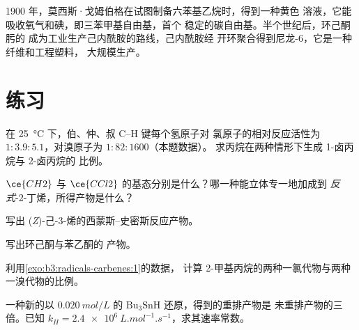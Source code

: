 \begin{history}
1900 年，莫西斯·戈姆伯格在试图制备六苯基乙烷时，得到一种黄色
溶液，它能吸收氧气和碘，即三苯甲基自由基，首个
稳定的碳自由基。半个世纪后，环己酮肟的
成为工业生产己内酰胺的路线，己内酰胺经
开环聚合得到尼龙-6，它是一种纤维和工程塑料，
大规模生产。
\end{history}

\section{练习}

\begin{exercise}[$\star$]\label{exo:b3:radicals-carbenes:1}
在 \qty{25}{\celsius} 下，伯、仲、叔 C--H 键每个氢原子对
氯原子的相对反应活性为 $1 : 3.9 : 5.1$，对溴原子为 $1 : 82 : 1600$（本题数据）。
求丙烷在两种情形下生成 1-卤丙烷与 2-卤丙烷的
比例。
\end{exercise}

\begin{exercise}[$\star$]\label{exo:b3:radicals-carbenes:2}
$\ce{CH2}$ 与 $\ce{CCl2}$ 的基态分别是什么？哪一种能立体专一地加成到
\textit{反式}-2-丁烯，所得产物是什么？
\end{exercise}

\begin{exercise}[$\star$]\label{exo:b3:radicals-carbenes:3}
写出 (\textit{Z})-己-3-烯的西蒙斯–史密斯反应产物。
\end{exercise}

\begin{exercise}[$\star$]\label{exo:b3:radicals-carbenes:4}
写出环己酮与苯乙酮的
产物。
\end{exercise}

\begin{exercise}[$\star\star$]\label{exo:b3:radicals-carbenes:5}
利用\cref{exo:b3:radicals-carbenes:1}的数据，
计算 2-甲基丙烷的两种一氯代物与两种一溴代物的比例。
\end{exercise}

\begin{exercise}[$\star\star$]\label{exo:b3:radicals-carbenes:6}
一种新的以 $\qty{0.020}{mol/L}$ 的 $\mathrm{Bu_3SnH}$ 还原，得到的重排产物是
未重排产物的三倍。已知 $k_H = \qty{2.4e6}{L.mol^{-1}.s^{-1}}$，求其速率常数。
\end{exercise}

